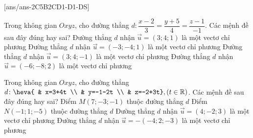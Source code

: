 \TNTF
{}[ans/ans-2C5B2CD1-D1-DS]
\begin{ex}%
	Trong không gian $Oxyz$, cho đường thẳng $d \colon \dfrac{x-2}{3}=\dfrac{y+5}{4}=\dfrac{z-1}{-1}$.  Các mệnh đề sau đây đúng hay sai?
\choiceTF
{ Đường thẳng $d$ nhận $\overrightarrow{u}=\left( 3;4;1 \right)$ là một vectơ chỉ phương}
{ \True Đường thẳng $d$ nhận $\overrightarrow{u}=\left( -3;-4;1 \right)$ là một vectơ chỉ phương}
{\True  Đường thẳng $d$ nhận $\overrightarrow{u}=\left( 3;4;-1 \right)$ là một vectơ chỉ phương}
{ \True Đường thẳng $d$ nhận $\overrightarrow{u}=\left( -6;-8;2 \right)$ là một vectơ chỉ phương}
\end{ex}
\begin{ex}%
	Trong không gian $Oxyz$, cho đường thẳng $d\colon \heva{
		& x=3+4t \\ 
		& y=-1-2t \\ 
		& z=-2+3t},( t\in \mathbb{R})$. Các mệnh đề sau đây đúng hay sai?
	\choiceTF
	{ Điểm $M\left( 7;-3;-1 \right)$ thuộc đường thẳng $d$}
	{ \True Điểm $N\left( -1;1;-5 \right)$ thuộc đường thẳng $d$}
	{\True  Đường thẳng $d$ nhận $\overrightarrow{u}=\left( 4;-2;3 \right)$ là một vectơ chỉ phương}
	{\True  Đường thẳng $d$ nhận $\overrightarrow{u}=-\left( -4;2;-3 \right)$ là một vectơ chỉ phương}
\end{ex}
